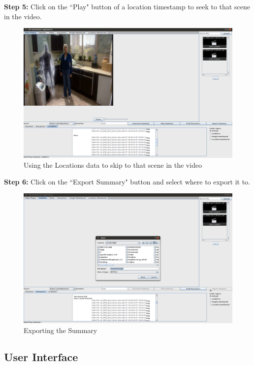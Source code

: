 \textbf{Step 5:} Click on the ``Play" button of a location timestamp to seek to that scene in the video. 
\begin{figure}[h1]
\begin{center}
 \includegraphics[trim = 0mm 0mm 0mm 0mm, clip,
 scale=0.22]{Images/05locations-Skipto.png}
  \caption{Using the Locations data to skip to that scene in the video}
 \end{center}
\end{figure}

\textbf{Step 6:} Click on the ``Export Summary" button and select where to export it to. 
\begin{figure}[h1]
\begin{center}
 \includegraphics[trim = 0mm 0mm 0mm 0mm, clip,
 scale=0.22]{Images/06Exporting.png}
  \caption{Exporting the Summary}
 \end{center}
\end{figure}

\newpage
\subsection{User Interface}

